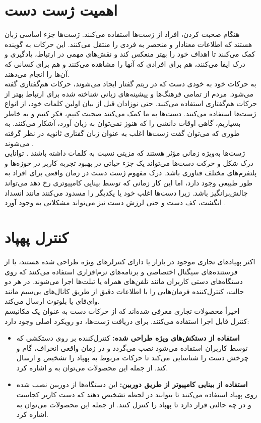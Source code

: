\section{اهمیت ژست دست}
هنگام صحبت کردن، افراد از ژست‌ها استفاده می‌کنند. ژست‌ها جزء اساسی زبان هستند که اطلاعات معنادار و منحصر به فردی را منتقل می‌کنند. این حرکات به گوینده کمک می‌کنند تا اهداف خود
 را بهتر منعکس کند و نقش‌های مهمی در ارتباط، یادگیری و درک ایفا می‌کنند، هم برای افرادی که آنها را مشاهده می‌کنند و هم برای کسانی که آن‌ها را انجام می‌دهند.
\\
به حرکات خود به خودی دست که در ریتم گفتار ایجاد می‌شوند، حرکات هم‌گفتاری  گفته می‌شود. مردم از تمامی فرهنگ‌ها و پیشینه‌های زبانی شناخته شده برای ارتباط بهتر از حرکات هم‌گفتاری استفاده می‌کنند. حتی نوزادان قبل از بیان اولین کلمات خود، از انواع ژست‌ها استفاده می‌کنند. دست‌ها به ما کمک می‌کنند صحبت کنیم، فکر کنیم و به خاطر بسپاریم، گاهی اوقات دانشی را که هنوز
 نمی‌توان به زبان آورد، آشکار می‌کنند. به طوری که می‌توان گفت ژست‌ها اغلب به عنوان زبان گفتاری ثانویه در نظر گرفته می‌شوند \cite{clough2020role}.
\\
ژست‌ها به‌ویژه زمانی مؤثر هستند که مزیتی نسبت به کلمات داشته باشند \cite{kang2016hands}. توانایی درک شکل و حرکت دست‌ها می‌تواند یک
 جزء حیاتی در بهبود تجربه کاربر  در حوزه‌ها و پلتفرم‌های مختلف فناوری باشد. درک مفهوم ژست دست در زمان واقعی برای افراد به طور طبیعی وجود دارد، اما این کار زمانی که توسط بینایی کامپیوتری رخ دهد می‌تواند چالش‌برانگیز باشد. زیرا
دست‌ها اغلب خود یا یکدیگر را مسدود می‌کنند مانند انسداد انگشت، کف دست و حتی لرزش دست نیز می‌تواند مشکلاتی به وجود آورد \cite{zhang2020mediapipe}.


\section{کنترل پهپاد}
اکثر پهپادهای تجاری موجود در بازار یا دارای کنترلرهای ویژه طراحی شده هستند، یا از فرستنده‌های سیگنال اختصاصی و برنامه‌های نرم‌افزاری استفاده می‌کنند که روی
 دستگاه‌های دستی کاربران مانند تلفن‌های همراه یا تبلت‌ها اجرا می‌شوند. در هر دو حالت، کنترل‌کننده فرمان‌هایی را با اطلاعات دقیق از طریق کانال‌های بی‌سیم مانند وای‌فای یا بلوتوث ارسال می‌کند. 
\\
اخیراً محصولات تجاری معرفی شده‌اند که از حرکات دست به عنوان یک مکانیسم کنترل قابل اجرا استفاده می‌کنند. برای دریافت ژست‌ها، دو رویکرد اصلی وجود دارد:
\begin{itemize}
    \item \textbf{استفاده از دستکش‌های ویژه طراحی شده:} کنترل‌کننده بر روی دستکشی که توسط کاربران استفاده می‌شود نصب می‌گردد و در زمان واقعی انحراف، گام و چرخش دست را شناسایی می‌کند تا حرکات مربوط به پهپاد را تشخیص و ارسال کند. از جمله این محصولات می‌توان به  و  اشاره کرد.
    \item \textbf{استفاده از بینایی کامپیوتر از طریق دوربین:} این دستگاه‌ها از دوربین نصب شده روی پهپاد استفاده می‌کنند تا بتوانند در لحظه تشخیص دهند که دست کاربر کجاست و در چه حالتی قرار دارد تا پهپاد را کنترل کنند. از جمله این محصولات می‌توان به  اشاره کرد.
\end{itemize}


